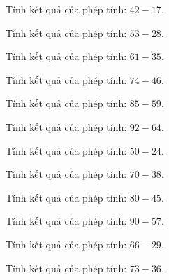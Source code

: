 \begin{ex}
Tính kết quả của phép tính: $42 - 17$.
\end{ex}

\begin{ex}
Tính kết quả của phép tính: $53 - 28$.
\end{ex}

\begin{ex}
Tính kết quả của phép tính: $61 - 35$.
\end{ex}

\begin{ex}
Tính kết quả của phép tính: $74 - 46$.
\end{ex}

\begin{ex}
Tính kết quả của phép tính: $85 - 59$.
\end{ex}

\begin{ex}
Tính kết quả của phép tính: $92 - 64$.
\end{ex}

\begin{ex}
Tính kết quả của phép tính: $50 - 24$.
\end{ex}

\begin{ex}
Tính kết quả của phép tính: $70 - 38$.
\end{ex}

\begin{ex}
Tính kết quả của phép tính: $80 - 45$.
\end{ex}

\begin{ex}
Tính kết quả của phép tính: $90 - 57$.
\end{ex}

\begin{ex}
Tính kết quả của phép tính: $66 - 29$.
\end{ex}

\begin{ex}
Tính kết quả của phép tính: $73 - 36$.
\end{ex}

